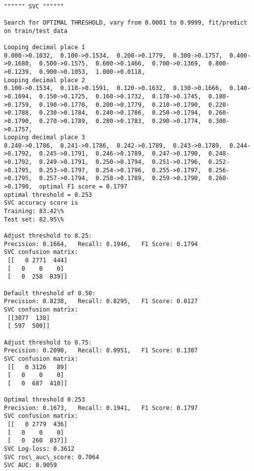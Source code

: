 \documentclass[11pt]{article}
\begin{document}
    \begin{Verbatim}[commandchars=\\\{\}]

"""""" SVC """"""

Search for OPTIMAL THRESHOLD, vary from 0.0001 to 0.9999, fit/predict on train/test data

Looping decimal place 1
0.000->0.1032,  0.100->0.1534,  0.200->0.1779,  0.300->0.1757,  0.400->0.1680,  0.500->0.1575,  0.600->0.1466,  0.700->0.1369,  0.800->0.1239,  0.900->0.1053,  1.000->0.0118,  
Looping decimal place 2
0.100->0.1534,  0.110->0.1591,  0.120->0.1632,  0.130->0.1666,  0.140->0.1694,  0.150->0.1725,  0.160->0.1732,  0.170->0.1745,  0.180->0.1759,  0.190->0.1770,  0.200->0.1779,  0.210->0.1790,  0.220->0.1788,  0.230->0.1784,  0.240->0.1786,  0.250->0.1794,  0.260->0.1790,  0.270->0.1789,  0.280->0.1783,  0.290->0.1774,  0.300->0.1757,  
Looping decimal place 3
0.240->0.1786,  0.241->0.1786,  0.242->0.1789,  0.243->0.1789,  0.244->0.1792,  0.245->0.1791,  0.246->0.1789,  0.247->0.1790,  0.248->0.1792,  0.249->0.1791,  0.250->0.1794,  0.251->0.1796,  0.252->0.1795,  0.253->0.1797,  0.254->0.1796,  0.255->0.1797,  0.256->0.1795,  0.257->0.1794,  0.258->0.1789,  0.259->0.1790,  0.260->0.1790,  optimal F1 score = 0.1797
optimal threshold = 0.253
SVC accuracy score is
Training: 83.42\%
Test set: 82.95\%

Adjust threshold to 0.25:
Precision: 0.1664,   Recall: 0.1946,   F1 Score: 0.1794
SVC confusion matrix: 
 [[   0 2771  444]
 [   0    0    0]
 [   0  258  839]]

Default threshold of 0.50:
Precision: 0.8238,   Recall: 0.8295,   F1 Score: 0.8127
SVC confusion matrix: 
 [[3077  138]
 [ 597  500]]

Adjust threshold to 0.75:
Precision: 0.2090,   Recall: 0.0951,   F1 Score: 0.1307
SVC confusion matrix: 
 [[   0 3126   89]
 [   0    0    0]
 [   0  687  410]]

Optimal threshold 0.253
Precision: 0.1673,   Recall: 0.1941,   F1 Score: 0.1797
SVC confusion matrix: 
 [[   0 2779  436]
 [   0    0    0]
 [   0  260  837]]
SVC Log-loss: 0.3612
SVC roc\_auc\_score: 0.7064
SVC AUC: 0.9059

    \end{Verbatim}

    \begin{center}
    \end{center}
    { \hspace*{\fill} \\}
    
\end{document}
